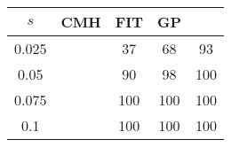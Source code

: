 \centering \begin{tabular}{c|c|c|c|c}
$s$	&CMH	&FIT	&GP	&\sc{Clear}\\\hline
0.025	&	&37	&68	&93\\
0.05	&	&90	&98	&100\\
0.075	&	&100	&100	&100\\
0.1	&	&100	&100	&100\\
\end{tabular}

